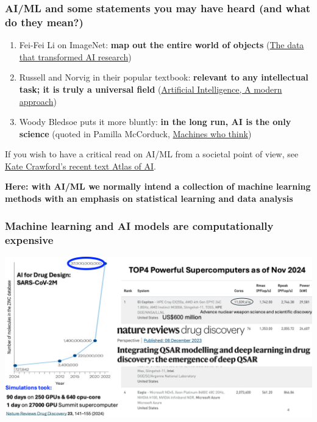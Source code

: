 \documentclass{beamer}
\begin{document}
\begin{frame}
\frametitle{AI/ML and some statements you may have heard (and what do they mean?)}



\begin{enumerate}
\item Fei-Fei Li on ImageNet: \textbf{map out the entire world of objects} (\href{{https://cacm.acm.org/news/219702-the-data-that-transformed-ai-research-and-possibly-the-world/fulltext}}{The data that transformed AI research})

\item Russell and Norvig in their popular textbook: \textbf{relevant to any intellectual task; it is truly a universal field} (\href{{http://aima.cs.berkeley.edu/}}{Artificial Intelligence, A modern approach})

\item Woody Bledsoe puts it more bluntly: \textbf{in the long run, AI is the only science} (quoted in Pamilla McCorduck, \href{{https://www.pamelamccorduck.com/machines-who-think}}{Machines who think})
\end{enumerate}

\noindent
If you wish to have a critical read on AI/ML from a societal point of view, see \href{{https://www.katecrawford.net/}}{Kate Crawford's recent text Atlas of AI}.

\textbf{Here: with AI/ML we normally intend a collection of machine learning methods with an emphasis on statistical learning and data analysis}
\end{frame}






\begin{frame}
\frametitle{Machine learning and AI models are computationally expensive}


\centerline{\includegraphics[width=1.0\linewidth]{figures/aitalk2.png}}

\end{frame}
\end{document}
